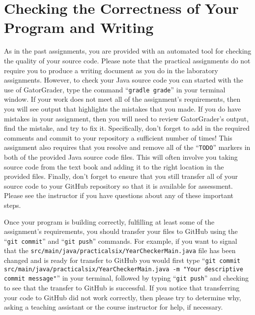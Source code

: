 \documentclass[11pt]{article}
\newcommand{\mainprogramsource}{\lstinline{src/main/java/practicalsix/YearCheckerMain.java}}
\newcommand{\gatorgraderstart}{\command{gradle grade}}
\newcommand{\gitcommit}{\command{git commit}}
\newcommand{\gitpush}{\command{git push}}
\newcommand{\gitcommitmainprogram}{\command{git commit src/main/java/practicalsix/YearCheckerMain.java -m "Your
descriptive commit message"}}
\newcommand{\command}[1]{``\lstinline{#1}''}
\begin{document}
\section*{Checking the Correctness of Your Program and Writing}

As in the past assignments, you are provided with an automated tool for checking
the quality of your source code. Please note that the practical assignments do
not require you to produce a writing document as you do in the laboratory
assignments. However, to check your Java source code you can started with the
use of GatorGrader, type the command \gatorgraderstart{} in your terminal
window. If your work does not meet all of the assignment's requirements, then
you will see output that highlights the mistakes that you made. If you do have
mistakes in your assignment, then you will need to review GatorGrader's output,
find the mistake, and try to fix it. Specifically, don't forget to add in the
required comments and commit to your repository a sufficient number of times!
This assignment also requires that you resolve and remove all of the
\command{TODO} markers in both of the provided Java source code files. This will
often involve you taking source code from the text book and adding it to the
right location in the provided files. Finally, don't forget to ensure that you
still transfer all of your source code to your GitHub repository so that it is
available for assessment. Please see the instructor if you have questions about
any of these important steps.

Once your program is building correctly, fulfilling at least some of the
assignment's requirements, you should transfer your files to GitHub using the
\gitcommit{} and \gitpush{} commands. For example, if you want to signal that
the \mainprogramsource{} file has been changed and is ready for transfer to
GitHub you would first type \gitcommitmainprogram{} in your terminal, followed
by typing \gitpush{} and checking to see that the transfer to GitHub is
successful. If you notice that transferring your code to GitHub did not work
correctly, then please try to determine why, asking a teaching assistant or the
course instructor for help, if necessary.
\end{document}
